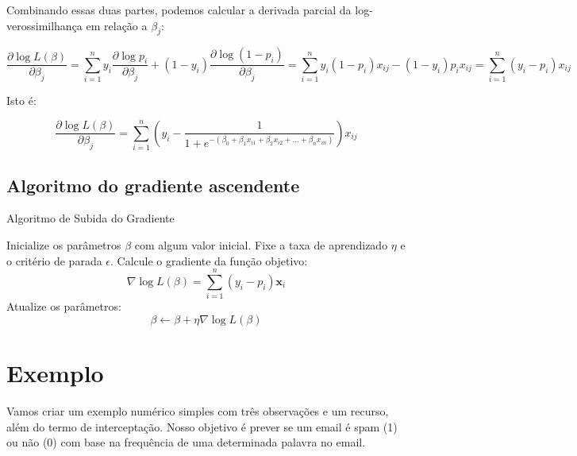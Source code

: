 \documentclass[12pt,a4paper, brazil]{article}
\begin{document}
\noindent Combinando essas duas partes, podemos calcular a derivada parcial da log-verossimilhança em relação a $\beta_j$:

\begin{equation}
  \frac{\partial \log L(\beta)}{\partial \beta_j} = \sum_{i=1}^{n} y_i \frac{\partial \log p_i}{\partial \beta_j} + (1 - y_i) \frac{\partial \log (1 - p_i)}{\partial \beta_j} = \sum_{i=1}^{n} y_i (1 - p_i) x_{ij} - (1 - y_i) p_i x_{ij} = \sum_{i=1}^{n} (y_i - p_i) x_{ij}
  \end{equation}

\noindent Isto é:

\begin{equation}
  \frac{\partial \log L(\beta)}{\partial \beta_j} = \sum_{i=1}^{n} \left(y_i - \frac{1}{1+e^{-(\beta_0 + \beta_1x_{i1} + \beta_2x_{i2} + ... + \beta_nx_{in})}}\right)x_{ij}
\end{equation}

\pagebreak

\subsection{Algoritmo do gradiente ascendente}

  \begin{algorithm} [!ht]
  \caption{Algoritmo de Subida do Gradiente}
  \begin{algorithmic}[1]
  \State Inicialize os parâmetros $\beta$ com algum valor inicial.
  \State Fixe a taxa de aprendizado $\eta$ e o critério de parada $\epsilon$.
  \Repeat
      \State Calcule o gradiente da função objetivo:
          \begin{equation*}
          \nabla \log L(\beta) = \sum_{i=1}^{n} (y_i - p_i) \mathbf{x}_i
          \end{equation*}
      \State Atualize os parâmetros:
          \begin{equation*}
          \beta \leftarrow \beta + \eta \nabla \log L(\beta)
          \end{equation*}
  \State \Return{$\beta$}
  \end{algorithmic}
  \end{algorithm}

  
\section{Exemplo}

Vamos criar um exemplo numérico simples com três observações e um recurso, além do termo de interceptação. Nosso objetivo é prever se um email é spam (1) ou não (0) com base na frequência de uma determinada palavra no email.
\end{document}
